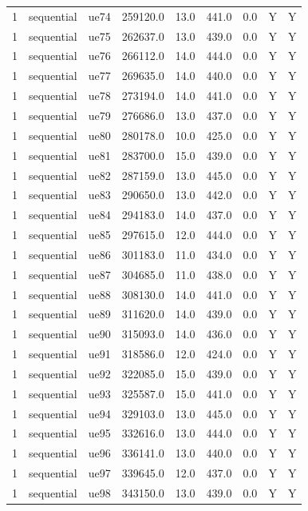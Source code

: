 \begin{table}[ht]
\begin{tabular}{|c|c|c|c|c|c|c|c|c|}
1 & sequential & ue74 & 259120.0 & 13.0 & 441.0 & 0.0 & Y & Y \\
1 & sequential & ue75 & 262637.0 & 13.0 & 439.0 & 0.0 & Y & Y \\
1 & sequential & ue76 & 266112.0 & 14.0 & 444.0 & 0.0 & Y & Y \\
1 & sequential & ue77 & 269635.0 & 14.0 & 440.0 & 0.0 & Y & Y \\
1 & sequential & ue78 & 273194.0 & 14.0 & 441.0 & 0.0 & Y & Y \\
1 & sequential & ue79 & 276686.0 & 13.0 & 437.0 & 0.0 & Y & Y \\
1 & sequential & ue80 & 280178.0 & 10.0 & 425.0 & 0.0 & Y & Y \\
1 & sequential & ue81 & 283700.0 & 15.0 & 439.0 & 0.0 & Y & Y \\
1 & sequential & ue82 & 287159.0 & 13.0 & 445.0 & 0.0 & Y & Y \\
1 & sequential & ue83 & 290650.0 & 13.0 & 442.0 & 0.0 & Y & Y \\
1 & sequential & ue84 & 294183.0 & 14.0 & 437.0 & 0.0 & Y & Y \\
1 & sequential & ue85 & 297615.0 & 12.0 & 444.0 & 0.0 & Y & Y \\
1 & sequential & ue86 & 301183.0 & 11.0 & 434.0 & 0.0 & Y & Y \\
1 & sequential & ue87 & 304685.0 & 11.0 & 438.0 & 0.0 & Y & Y \\
1 & sequential & ue88 & 308130.0 & 14.0 & 441.0 & 0.0 & Y & Y \\
1 & sequential & ue89 & 311620.0 & 14.0 & 439.0 & 0.0 & Y & Y \\
1 & sequential & ue90 & 315093.0 & 14.0 & 436.0 & 0.0 & Y & Y \\
1 & sequential & ue91 & 318586.0 & 12.0 & 424.0 & 0.0 & Y & Y \\
1 & sequential & ue92 & 322085.0 & 15.0 & 439.0 & 0.0 & Y & Y \\
1 & sequential & ue93 & 325587.0 & 15.0 & 441.0 & 0.0 & Y & Y \\
1 & sequential & ue94 & 329103.0 & 13.0 & 445.0 & 0.0 & Y & Y \\
1 & sequential & ue95 & 332616.0 & 13.0 & 444.0 & 0.0 & Y & Y \\
1 & sequential & ue96 & 336141.0 & 13.0 & 440.0 & 0.0 & Y & Y \\
1 & sequential & ue97 & 339645.0 & 12.0 & 437.0 & 0.0 & Y & Y \\
1 & sequential & ue98 & 343150.0 & 13.0 & 439.0 & 0.0 & Y & Y \\

\end{tabular}
\end{table}
